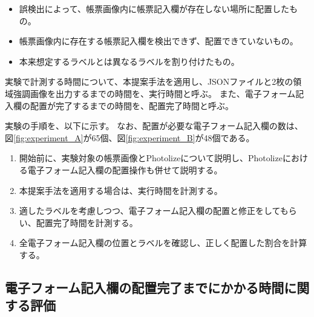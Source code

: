 \begin{itemize}
    \item 誤検出によって、帳票画像内に帳票記入欄が存在しない場所に配置したもの。
    \item 帳票画像内に存在する帳票記入欄を検出できず、配置できていないもの。
    \item 本来想定するラベルとは異なるラベルを割り付けたもの。
\end{itemize}

実験で計測する時間について、本提案手法を適用し、JSONファイルと2枚の領域強調画像を出力するまでの時間を、実行時間と呼ぶ。
また、電子フォーム記入欄の配置が完了するまでの時間を、配置完了時間と呼ぶ。

実験の手順を、以下に示す。
なお、配置が必要な電子フォーム記入欄の数は、図\ref{fig:experiment_A}が65個、図\ref{fig:experiment_B}が48個である。

\begin{enumerate}
    \item 開始前に、実験対象の帳票画像とPhotolizeについて説明し、Photolizeにおける電子フォーム記入欄の配置操作も併せて説明する。
    \item 本提案手法を適用する場合は、実行時間を計測する。
    \item 適したラベルを考慮しつつ、電子フォーム記入欄の配置と修正をしてもらい、配置完了時間を計測する。
    \item 全電子フォーム記入欄の位置とラベルを確認し、正しく配置した割合を計算する。
\end{enumerate}

\subsection{電子フォーム記入欄の配置完了までにかかる時間に関する評価}\label{subsec:evalue_required_time}

